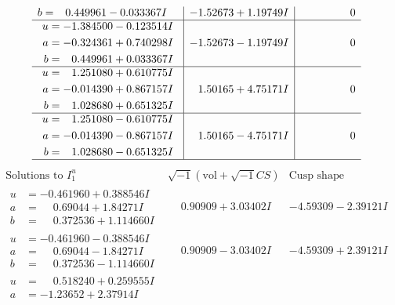 \documentclass[1p]{elsarticle_modified}
\theoremstyle{definition}
\newcommand{\I}{\sqrt{-1}}
\begin{document}
$$\begin{array}{c|c|c}
\begin{aligned}
b &= \phantom{-}0.449961 - 0.033367 I\end{aligned}
 & -1.52673 + 1.19749 I & \phantom{-0.000000 } 0 \\ \hline\begin{aligned}
u &= -1.384500 - 0.123514 I \\
a &= -0.324361 + 0.740298 I \\
b &= \phantom{-}0.449961 + 0.033367 I\end{aligned}
 & -1.52673 - 1.19749 I & \phantom{-0.000000 } 0 \\ \hline\begin{aligned}
u &= \phantom{-}1.251080 + 0.610775 I \\
a &= -0.014390 + 0.867157 I \\
b &= \phantom{-}1.028680 + 0.651325 I\end{aligned}
 & \phantom{-}1.50165 + 4.75171 I & \phantom{-0.000000 } 0 \\ \hline\begin{aligned}
u &= \phantom{-}1.251080 - 0.610775 I \\
a &= -0.014390 - 0.867157 I \\
b &= \phantom{-}1.028680 - 0.651325 I\end{aligned}
 & \phantom{-}1.50165 - 4.75171 I & \phantom{-0.000000 } 0\\
 \hline 
 \end{array}$$\newpage$$\begin{array}{c|c|c}  
\text{Solutions to }I^u_{1}& \I (\text{vol} + \sqrt{-1}CS) & \text{Cusp shape}\\
 \hline 
\begin{aligned}
u &= -0.461960 + 0.388546 I \\
a &= \phantom{-}0.69044 + 1.84271 I \\
b &= \phantom{-}0.372536 + 1.114660 I\end{aligned}
 & \phantom{-}0.90909 + 3.03402 I & -4.59309 - 2.39121 I \\ \hline\begin{aligned}
u &= -0.461960 - 0.388546 I \\
a &= \phantom{-}0.69044 - 1.84271 I \\
b &= \phantom{-}0.372536 - 1.114660 I\end{aligned}
 & \phantom{-}0.90909 - 3.03402 I & -4.59309 + 2.39121 I \\ \hline\begin{aligned}
u &= \phantom{-}0.518240 + 0.259555 I \\
a &= -1.23652 + 2.37914 I \\

\end{aligned}
\end{array}$$
\end{document}
